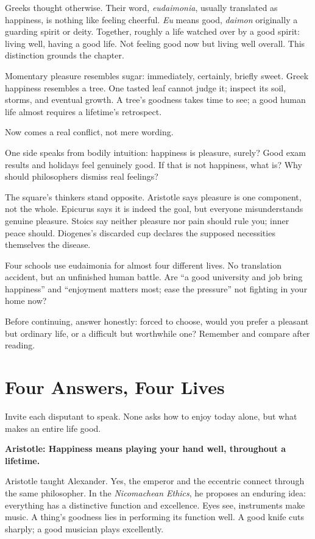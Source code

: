 Greeks thought otherwise. Their word, \textit{eudaimonia}, usually translated as happiness, is nothing like feeling cheerful. \textit{Eu} means good, \textit{daimon} originally a guarding spirit or deity. Together, roughly a life watched over by a good spirit: living well, having a good life. Not feeling good now but living well overall. This distinction grounds the chapter.

Momentary pleasure resembles sugar: immediately, certainly, briefly sweet. Greek happiness resembles a tree. One tasted leaf cannot judge it; inspect its soil, storms, and eventual growth. A tree's goodness takes time to see; a good human life almost requires a lifetime's retrospect.

Now comes a real conflict, not mere wording.

One side speaks from bodily intuition: happiness is pleasure, surely? Good exam results and holidays feel genuinely good. If that is not happiness, what is? Why should philosophers dismiss real feelings?

The square's thinkers stand opposite. Aristotle says pleasure is one component, not the whole. Epicurus says it is indeed the goal, but everyone misunderstands genuine pleasure. Stoics say neither pleasure nor pain should rule you; inner peace should. Diogenes's discarded cup declares the supposed necessities themselves the disease.

Four schools use eudaimonia for almost four different lives. No translation accident, but an unfinished human battle. Are ``a good university and job bring happiness'' and ``enjoyment matters most; ease the pressure'' not fighting in your home now?

Before continuing, answer honestly: forced to choose, would you prefer a pleasant but ordinary life, or a difficult but worthwhile one? Remember and compare after reading.

\section{Four Answers, Four Lives}
Invite each disputant to speak. None asks how to enjoy today alone, but what makes an entire life good.

\textbf{Aristotle: Happiness means playing your hand well, throughout a lifetime.}

Aristotle taught Alexander. Yes, the emperor and the eccentric connect through the same philosopher. In the \textit{Nicomachean Ethics}, he proposes an enduring idea: everything has a distinctive function and excellence. Eyes see, instruments make music. A thing's goodness lies in performing its function well. A good knife cuts sharply; a good musician plays excellently.

